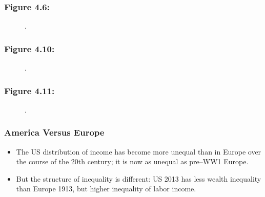 \documentclass[t]{beamer}\usepackage[]{graphicx}\usepackage[]{color}
\begin{document}


\begin{frame}[label=Figure_4_6]
\frametitle{Figure 4.6: }
\begin{figure}[t]
\begin{minipage}[b]{\textwidth}
\centering

\caption{.}
\end{minipage}
\end{figure}
\end{frame}




\begin{frame}[label=Figure_4_10]
\frametitle{Figure 4.10: }
\begin{figure}[t]
\begin{minipage}[b]{\textwidth}
\centering

\caption{.}
\end{minipage}
\end{figure}
\end{frame}


\begin{frame}[label=Figure_4_11]
\frametitle{Figure 4.11: }
\begin{figure}[t]
\begin{minipage}[b]{\textwidth}
\centering

\caption{.}
\end{minipage}
\end{figure}
\end{frame}


\begin{frame}[label=USAvEU]
\frametitle{America Versus Europe}
\begin{itemize}
\item
The US distribution of income has become more unequal than in Europe over the course of the 20th century; it is now as unequal as pre--WW1 Europe.
\item 
But the structure of inequality is different: US 2013 has less wealth inequality than Europe 1913, but higher inequality of labor income.
\end{itemize}
\end{frame}
\end{document}
